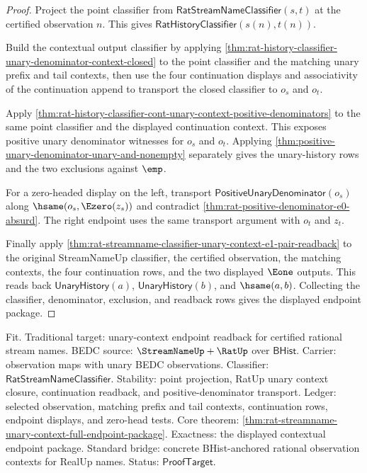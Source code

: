 \begin{proof}
Project the point classifier from
$\mathsf{RatStreamNameClassifier}(s,t)$ at the certified observation $n$. This
gives $\mathsf{RatHistoryClassifier}(s(n),t(n))$.

Build the contextual output classifier by applying
\autoref{thm:rat-history-classifier-unary-denominator-context-closed} to the
point classifier and the matching unary prefix and tail contexts, then use the
four continuation displays and associativity of the continuation append to
transport the closed classifier to $o_s$ and $o_t$.

Apply
\autoref{thm:rat-history-classifier-cont-unary-context-positive-denominators}
to the same point classifier and the displayed continuation context. This
exposes positive unary denominator witnesses for $o_s$ and $o_t$. Applying
\autoref{thm:positive-unary-denominator-unary-and-nonempty} separately gives
the unary-history rows and the two exclusions against $\emp$.

For a zero-headed display on the left, transport
$\mathsf{PositiveUnaryDenominator}(o_s)$ along $\hsame(o_s,\Ezero(z_s))$ and
contradict \autoref{thm:rat-positive-denominator-e0-absurd}. The right endpoint
uses the same transport argument with $o_t$ and $z_t$.

Finally apply
\autoref{thm:rat-streamname-classifier-unary-context-e1-pair-readback} to the
original StreamNameUp classifier, the certified observation, the matching
contexts, the four continuation rows, and the two displayed $\Eone$ outputs.
This reads back $\mathsf{UnaryHistory}(a)$, $\mathsf{UnaryHistory}(b)$, and
$\hsame(a,b)$. Collecting the classifier, denominator, exclusion, and readback
rows gives the displayed endpoint package.
\end{proof}

Fit. Traditional target: unary-context endpoint readback for certified rational
stream names. BEDC source: $\StreamNameUp+\RatUp$ over $\mathsf{BHist}$.
Carrier: observation maps with unary BEDC observations. Classifier:
$\mathsf{RatStreamNameClassifier}$. Stability: point projection, RatUp unary
context closure, continuation readback, and positive-denominator transport.
Ledger: selected observation, matching prefix and tail contexts, continuation
rows, endpoint displays, and zero-head tests. Core theorem:
\autoref{thm:rat-streamname-unary-context-full-endpoint-package}. Exactness:
the displayed contextual endpoint package. Standard bridge: concrete
BHist-anchored rational observation contexts for RealUp names. Status:
$\mathsf{ProofTarget}$.

